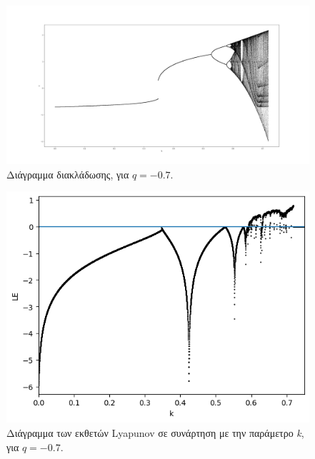 \begin{figure}[h!]
	\centering
	\includegraphics[width=0.8\linewidth]{LateX images/graphs q07/g1}
	\caption{ Διάγραμμα διακλάδωσης, για $q=-0.7$.}
	\label{f:g12}
\end{figure}
\begin{figure}[h!]
	\centering
	\includegraphics[width=0.6\linewidth]{"LateX images/graphs q07/g2 "}
	\caption{Διάγραμμα των εκθετών Lyapunov σε συνάρτηση με την παράμετρο \emph{k}, για $q=-0.7$.}
	\label{f:g13}
\end{figure}

